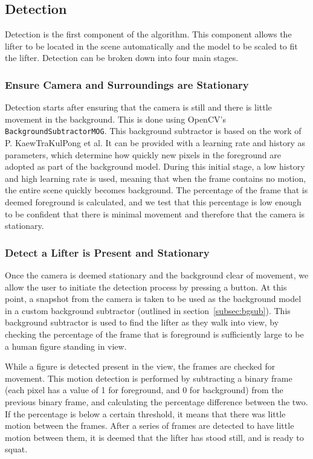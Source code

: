 \subsection{Detection}

Detection is the first component of the algorithm. This component allows the lifter to be located in the scene automatically and the model to be scaled to fit the lifter. Detection can be broken down into four main stages.

\subsubsection{Ensure Camera and Surroundings are Stationary}
Detection starts after ensuring that the camera is still and there is little movement in the background. This is done using OpenCV's \texttt{BackgroundSubtractorMOG}. This background subtractor is based on the work of P. KaewTraKulPong et al\cite{backgroundsubmog}. It can be provided with a learning rate and history as parameters, which determine how quickly new pixels in the foreground are adopted as part of the background model. During this initial stage, a low history and high learning rate is used, meaning that when the frame contains no motion, the entire scene quickly becomes background. The percentage of the frame that is deemed foreground is calculated, and we test that this percentage is low enough to be confident that there is minimal movement and therefore that the camera is stationary.

\subsubsection{Detect a Lifter is Present and Stationary}
Once the camera is deemed stationary and the background clear of movement, we allow the user to initiate the detection process by pressing a button. At this point, a snapshot from the camera is taken to be used as the background model in a custom background subtractor (outlined in section~\ref{subsec:bgsub}). This background subtractor is used to find the lifter as they walk into view, by checking the percentage of the frame that is foreground is sufficiently large to be a human figure standing in view. 

While a figure is detected present in the view, the frames are checked for movement. This motion detection is performed by subtracting a binary frame (each pixel has a value of 1 for foreground, and 0 for background) from the previous binary frame, and calculating the percentage difference between the two. If the percentage is below a certain threshold, it means that there was little motion between the frames. After a series of frames are detected to have little motion between them, it is deemed that the lifter has stood still, and is ready to squat.


